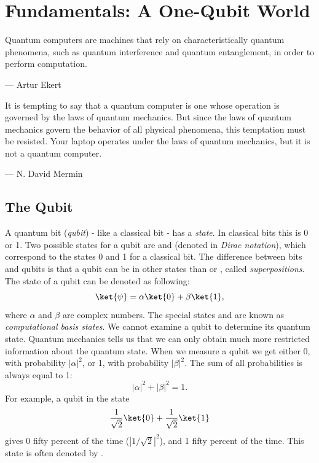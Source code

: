 \chapter{Fundamentals: A One-Qubit World}
\epigraph{Quantum computers are machines that rely on characteristically quantum phenomena, such as quantum interference and quantum entanglement, in order to perform computation.}{--- Artur Ekert}

\epigraph{It is tempting to say that a quantum computer is one whose operation is governed by the laws of quantum mechanics. But since the laws of quantum mechanics govern the behavior of all physical phenomena, this temptation must be resisted. Your laptop operates under the laws of quantum mechanics, but it is not a quantum computer.}{--- N. David Mermin}

\section{The Qubit}
A quantum bit (\emph{qubit}) - like a classical bit - has a \emph{state}. In classical bits this is 0 or 1. Two possible states for a qubit are  and  (denoted in \emph{Dirac notation}), which correspond to the states 0 and 1 for a classical bit. The difference between bits and qubits is that a qubit can be in other states than  or , called \emph{superpositions}. The state of a qubit can be denoted as following:
\begin{equation}
  \ket{\psi} = \alpha\ket{0} + \beta\ket{1},
\end{equation}
where $\alpha$ and $\beta$ are complex numbers. The special states  and  are known as \emph{computational basis states}. We cannot examine a qubit to determine its quantum state. Quantum mechanics tells us that we can only obtain much more restricted information about the quantum state. When we measure a qubit we get either 0, with probability $|\alpha|^2$, or 1, with probability $|\beta|^2$. The sum of all probabilities is always equal to 1:
\begin{equation}
  |\alpha|^2 + |\beta|^2 = 1.
\end{equation}
For example, a qubit in the state
\begin{equation}
  \dfrac{1}{\sqrt2}\ket{0}+\dfrac{1}{\sqrt2}\ket{1}
\end{equation}
gives 0 fifty percent of the time ($|1/\sqrt2|^2$), and 1 fifty percent of the time. This state is often denoted by \ket{+}.

